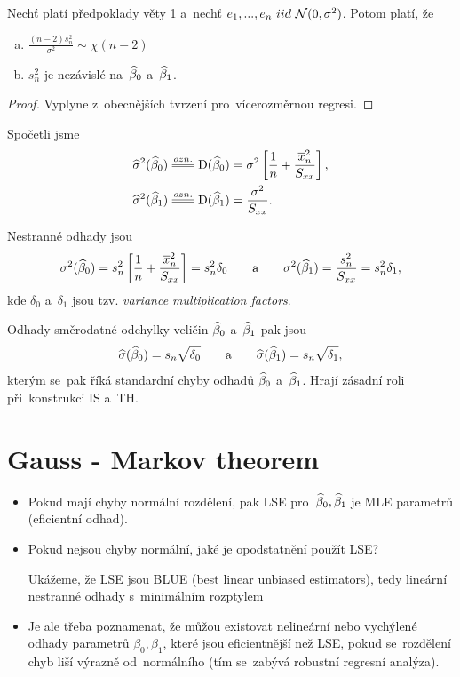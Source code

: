 \begin{corollary}\label{tvrzeni}
	Nechť platí předpoklady věty 1 a~nechť $e_1,..., e_n~iid~\mathcal{N}(0,\sigma^2)$. Potom platí, že
	\begin{enumerate}[a)]
		\item $\frac{(n-2)s_n^2}{\sigma^2} \sim \chi(n-2)$
		\item $s_n^2$ je nezávislé na~$\widehat{\beta}_0$ a~$\widehat{\beta}_1$.
	\end{enumerate}
\end{corollary}
\begin{proof}
	Vyplyne z~obecnějších tvrzení pro~vícerozměrnou regresi.
\end{proof}


\begin{remark}
	Spočetli jsme
	 \begin{align}
		\widehat{\sigma}^2(\wbeta_0) & \equal{ozn.}\D(\wbeta_0) = \sigma^2 \left[\frac{1}{n} + \frac{\lxn^2}{\Sxx} \right], \label{Vzorec: sigma(beta_0)} \\
		\widehat{\sigma}^2(\wbeta_1) & \equal{ozn.}\D(\wbeta_1) = \frac{\sigma^2}{\Sxx}. \label{Vzorec: sigma(beta_1)}
	 \end{align}
	
	Nestranné odhady jsou
	$$
		\sigma^2(\widehat{\beta}_0) = s_n^2  \left[\frac{1}{n} + \frac{\overline{x}_n^2}{S_{xx}} \right] = s_n^2 \delta_0 \qquad\text{a}\qquad
		\sigma^2(\widehat{\beta}_1) = \frac{s_n^2}{S_{xx}} = s_n^2 \delta_1,
	$$
	kde $\delta_0$ a~$\delta_1$ jsou tzv. \textit{variance multiplication factors}.
	
	Odhady směrodatné odchylky veličin $\widehat{\beta}_0$ a~$\widehat{\beta}_1$ pak jsou
	 $$
		\widehat{\sigma}(\widehat{\beta}_0) = s_n \sqrt{\delta_0} \qquad \text{a} \qquad \widehat{\sigma}(\widehat{\beta}_1) = s_n \sqrt{\delta_1},
	 $$
	kterým se~pak říká standardní chyby odhadů $\widehat{\beta}_0$ a~$\widehat{\beta}_1$. Hrají zásadní roli při~konstrukci IS a~TH.
\end{remark}

\section{Gauss - Markov theorem}

\begin{itemize}
	\item Pokud mají chyby normální rozdělení, pak LSE pro~$\widehat{\beta}_0, \widehat{\beta}_1$ je MLE parametrů (eficientní odhad).
	\item Pokud nejsou chyby normální, jaké je opodstatnění použít LSE?
	
	Ukážeme, že LSE jsou BLUE (best linear unbiased estimators), tedy lineární nestranné odhady s~minimálním rozptylem
	\item Je ale třeba poznamenat, že můžou existovat nelineární nebo vychýlené odhady parametrů $\beta_0, \beta_1$, které jsou eficientnější než LSE, pokud se~rozdělení chyb liší výrazně od~normálního (tím se~zabývá robustní regresní analýza).
\end{itemize}

